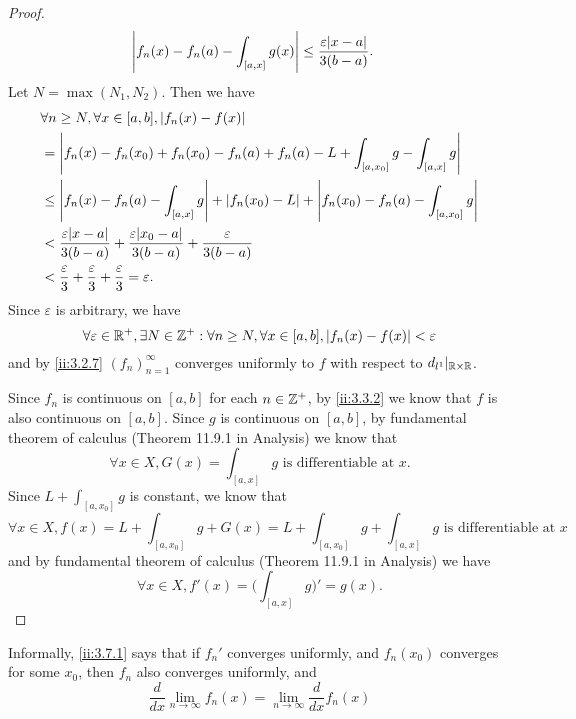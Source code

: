\begin{proof}
\begin{align*}
             & \abs{f_n(x) - f_n(a) - \int_{[a, x]} g(x)} \leq \dfrac{\varepsilon \abs{x - a}}{3(b - a)}.
  \end{align*}
  Let \(N = \max(N_1, N_2)\).
  Then we have
  \begin{align*}
     & \forall n \geq N, \forall x \in [a, b], \abs{f_n(x) - f(x)}                                                               \\
     & = \abs{f_n(x) - f_n(x_0) + f_n(x_0) - f_n(a) + f_n(a) - L + \int_{[a, x_0]} g - \int_{[a, x]} g}                          \\
     & \leq \abs{f_n(x) - f_n(a) - \int_{[a, x]} g} + \abs{f_n(x_0) - L} + \abs{f_n(x_0) - f_n(a) - \int_{[a, x_0]} g}           \\
     & < \dfrac{\varepsilon \abs{x - a}}{3(b - a)} + \dfrac{\varepsilon \abs{x_0 - a}}{3(b - a)} + \dfrac{\varepsilon}{3(b - a)} \\
     & < \dfrac{\varepsilon}{3} + \dfrac{\varepsilon}{3} + \dfrac{\varepsilon}{3} = \varepsilon.
  \end{align*}
  Since \(\varepsilon\) is arbitrary, we have
  \[
    \forall \varepsilon \in \mathbb{R}^+, \exists N \in \mathbb{Z}^+ : \forall n \geq N, \forall x \in [a, b], \left\lvert f_n(x) - f(x)\right\rvert < \varepsilon
  \]
  and by \cref{ii:3.2.7} \((f_n)_{n = 1}^\infty\) converges uniformly to \(f\) with respect to \(d_{l^1}|_{\mathbb{R} \times \mathbb{R}}\).

  Since \(f_n\) is continuous on \([a, b]\) for each \(n \in \mathbb{Z}^+\), by \cref{ii:3.3.2} we know that \(f\) is also continuous on \([a, b]\).
  Since \(g\) is continuous on \([a, b]\), by fundamental theorem of calculus (Theorem 11.9.1 in Analysis) we know that
  \[
    \forall x \in X, G(x) = \int_{[a, x]} g \text{ is differentiable at } x.
  \]
  Since \(L + \int_{[a, x_0]} g\) is constant, we know that
  \[
    \forall x \in X, f(x) = L + \int_{[a, x_0]} g + G(x) = L + \int_{[a, x_0]} g + \int_{[a, x]} g \text{ is differentiable at } x
  \]
  and by fundamental theorem of calculus (Theorem 11.9.1 in Analysis) we have
  \[
    \forall x \in X, f'(x) = \bigg(\int_{[a, x]} g\bigg)' = g(x).
  \]
\end{proof}

\begin{note}
  Informally, \cref{ii:3.7.1} says that if \(f_n'\) converges uniformly, and \(f_n(x_0)\) converges for some \(x_0\), then \(f_n\) also converges uniformly, and
  \[
    \dfrac{d}{dx} \lim_{n \to \infty} f_n(x) = \lim_{n \to \infty} \dfrac{d}{dx} f_n(x)
  \]
\end{note}

